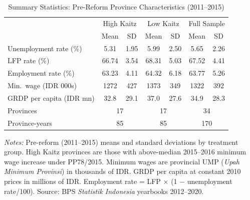 
\begin{table}[htbp]
\centering
\caption{Summary Statistics: Pre-Reform Province Characteristics (2011--2015)}
\label{tab:summary}
\begin{threeparttable}
\begin{tabular}{lcccccc}
\hline\hline
 & \multicolumn{2}{c}{High Kaitz} & \multicolumn{2}{c}{Low Kaitz} & \multicolumn{2}{c}{Full Sample} \\
 & Mean & SD & Mean & SD & Mean & SD \\
\hline
Unemployment rate (\%) & 5.31 & 1.95 & 5.99 & 2.50 & 5.65 & 2.26 \\
LFP rate (\%) & 66.74 & 3.54 & 68.31 & 5.03 & 67.52 & 4.41 \\
Employment rate (\%) & 63.23 & 4.11 & 64.32 & 6.18 & 63.77 & 5.26 \\
Min.\ wage (IDR 000s) & 1272 & 427 & 1373 & 349 & 1322 & 392 \\
GRDP per capita (IDR mn) & 32.8 & 29.1 & 37.0 & 27.6 & 34.9 & 28.3 \\
\hline
Provinces & \multicolumn{2}{c}{17} & \multicolumn{2}{c}{17} & \multicolumn{2}{c}{34} \\
Province-years & \multicolumn{2}{c}{85} & \multicolumn{2}{c}{85} & \multicolumn{2}{c}{170} \\
\hline\hline
\end{tabular}
\begin{tablenotes}[flushleft]
\small
\item \textit{Notes:} Pre-reform (2011--2015) means and standard deviations by treatment group. High Kaitz provinces are those with above-median 2015--2016 minimum wage increase under PP78/2015. Minimum wages are provincial UMP (\textit{Upah Minimum Provinsi}) in thousands of IDR. GRDP per capita at constant 2010 prices in millions of IDR. Employment rate = LFP $\times$ (1 $-$ unemployment rate/100). Source: BPS \textit{Statistik Indonesia} yearbooks 2012--2020.
\end{tablenotes}
\end{threeparttable}
\end{table}

